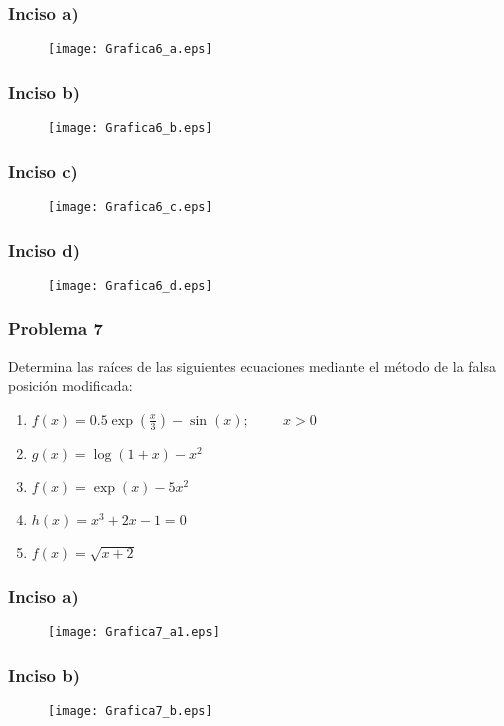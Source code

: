\begin{frame}
\frametitle{Inciso a)}
\begin{figure}
	\centering
	\texttt{[image: Grafica6\_a.eps]}
\end{figure}
\end{frame}
\begin{frame}
\frametitle{Inciso b)}
\begin{figure}
	\centering
	\texttt{[image: Grafica6\_b.eps]}
\end{figure}
\end{frame}
\begin{frame}
\frametitle{Inciso c)}
\begin{figure}
	\centering
	\texttt{[image: Grafica6\_c.eps]}
\end{figure}
\end{frame}
\begin{frame}
\frametitle{Inciso d)}
\begin{figure}
	\centering
	\texttt{[image: Grafica6\_d.eps]}
\end{figure}
\end{frame}
\begin{frame}
\frametitle{Problema 7}
Determina las ra\'{i}ces de las siguientes ecuaciones mediante el m\'{e}todo de la falsa posici\'{o}n modificada:
	\begin{enumerate}
		\renewcommand{\arraystretch}{1.5}
		\item $f(x) = 0.5\exp(\frac{x}{3})- \sin(x); \hspace{1cm} x > 0$
		\item $g(x) = \log(1 + x) - x^{2}$
		\item $f(x) = \exp(x) - 5x^{2}$
		\item $h(x) = x^{3} + 2x - 1 = 0$
		\item $f(x) = \sqrt{x+2}$
	\end{enumerate}
\end{frame}
\begin{frame}
\frametitle{Inciso a)}
\begin{figure}
	\centering
	\texttt{[image: Grafica7\_a1.eps]}
\end{figure}
\end{frame}
\begin{frame}
\frametitle{Inciso b)}
\begin{figure}
	\centering
	\texttt{[image: Grafica7\_b.eps]}
\end{figure}
\end{frame}
